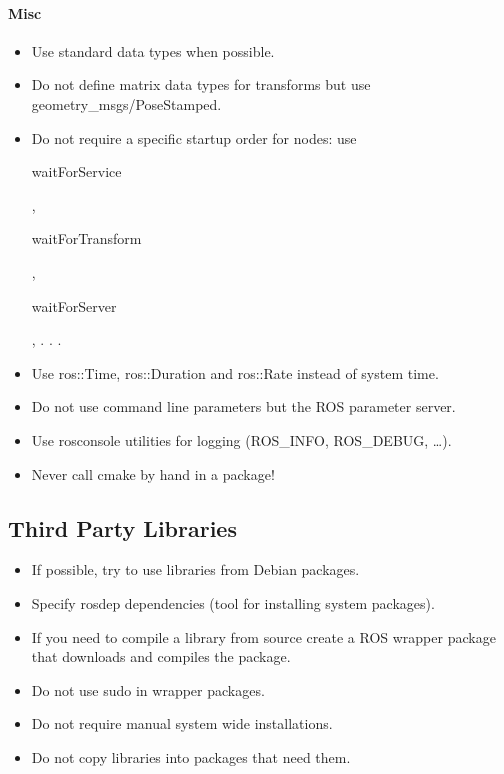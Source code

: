 \paragraph{Misc}
\begin{itemize}
\item Use standard data types when possible.
\item Do not define matrix data types for transforms but use geometry\_msgs/PoseStamped.
\item Do not require a specific startup order for nodes: use \begin{tt}waitForService\end{tt}, \begin{tt}waitForTransform\end{tt}, \begin{tt}waitForServer\end{tt}, . . .
\item Use ros::Time, ros::Duration and ros::Rate instead of system time.
\item Do not use command line parameters but the ROS parameter server.
\item Use rosconsole utilities for logging (ROS\_INFO, ROS\_DEBUG, \ldots).
\item Never call cmake by hand in a package!
\end{itemize}


\subsection{Third Party Libraries}
\begin{itemize}
\item If possible, try to use libraries from Debian packages.
\item Specify rosdep dependencies (tool for installing system packages).
\item If you need to compile a library from source create a ROS wrapper
package that downloads and compiles the package.
\item Do not use sudo in wrapper packages.
\item Do not require manual system wide installations.
\item Do not copy libraries into packages that need them.
\end{itemize}


